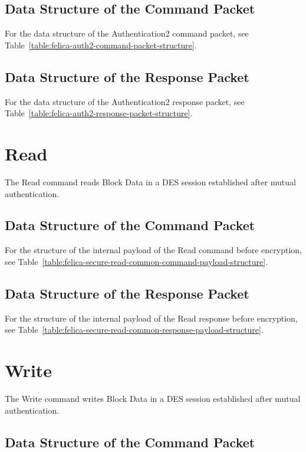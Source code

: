\documentclass[a4paper,11pt]{report}
\begin{document}
\subsection{Data Structure of the Command Packet}

For the data structure of the Authentication2 command packet, see Table~\ref{table:felica-auth2-command-packet-structure}.

\subsection{Data Structure of the Response Packet}

For the data structure of the Authentication2 response packet, see Table~\ref{table:felica-auth2-response-packet-structure}.

\section{Read}

The Read command reads Block Data in a DES session established after mutual authentication.

\subsection{Data Structure of the Command Packet}

For the structure of the internal payload of the Read command before encryption, see Table~\ref{table:felica-secure-read-common-command-payload-structure}.

\subsection{Data Structure of the Response Packet}

For the structure of the internal payload of the Read response before encryption, see Table~\ref{table:felica-secure-read-common-response-payload-structure}.

\section{Write}

The Write command writes Block Data in a DES session established after mutual authentication.

\subsection{Data Structure of the Command Packet}
\end{document}
